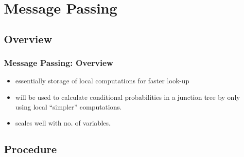 \section{Message Passing}



\subsection{Overview}

\begin{frame}\frametitle{Message Passing: Overview}

\begin{itemize}
\item essentially storage of local computations for faster look-up
\item will be used to calculate conditional probabilities in a junction tree by only using local ``simpler'' computations.
\item scales well with no. of variables.
\end{itemize}

\end{frame}

\subsection{Procedure}

